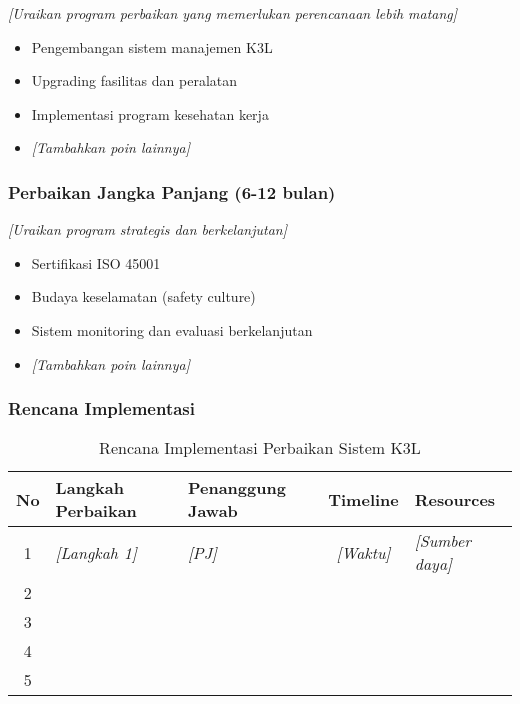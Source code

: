 \textit{[Uraikan program perbaikan yang memerlukan perencanaan lebih matang]}

\begin{itemize}
    \item Pengembangan sistem manajemen K3L
    \item Upgrading fasilitas dan peralatan
    \item Implementasi program kesehatan kerja
    \item \textit{[Tambahkan poin lainnya]}
\end{itemize}

\vspace{0.5cm}

\subsubsection{Perbaikan Jangka Panjang (6-12 bulan)}

\textit{[Uraikan program strategis dan berkelanjutan]}

\begin{itemize}
    \item Sertifikasi ISO 45001
    \item Budaya keselamatan (safety culture)
    \item Sistem monitoring dan evaluasi berkelanjutan
    \item \textit{[Tambahkan poin lainnya]}
\end{itemize}

\vspace{0.5cm}

\subsubsection{Rencana Implementasi}

\begin{table}[h]
\centering
\small
\begin{tabular}{|c|p{4cm}|p{3cm}|c|p{2.5cm}|}
\hline
\textbf{No} & \textbf{Langkah Perbaikan} & \textbf{Penanggung Jawab} & \textbf{Timeline} & \textbf{Resources} \\
\hline
1 & \textit{[Langkah 1]} & \textit{[PJ]} & \textit{[Waktu]} & \textit{[Sumber daya]} \\
\hline
2 & & & & \\
\hline
3 & & & & \\
\hline
4 & & & & \\
\hline
5 & & & & \\
\hline
\end{tabular}
\caption{Rencana Implementasi Perbaikan Sistem K3L}
\label{tab:rencana-implementasi}
\end{table}

